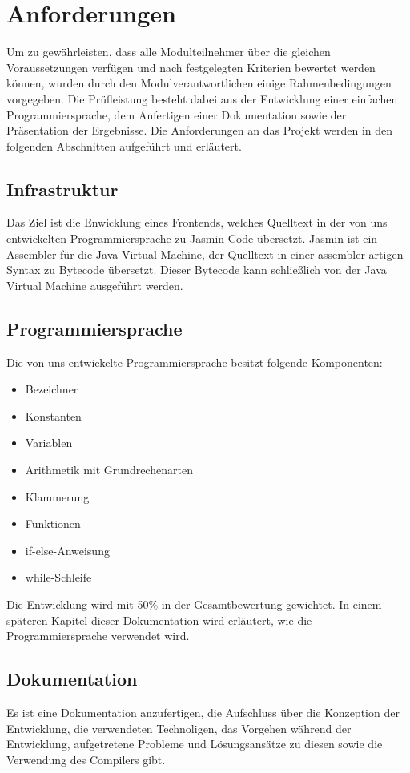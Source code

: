
\section{Anforderungen}

Um zu gewährleisten, dass alle Modulteilnehmer über die gleichen Voraussetzungen verfügen und nach festgelegten Kriterien bewertet werden können, wurden durch den Modulverantwortlichen einige Rahmenbedingungen vorgegeben. Die Prüfleistung besteht dabei aus der Entwicklung einer einfachen Programmiersprache, dem Anfertigen einer Dokumentation sowie der Präsentation der Ergebnisse. Die Anforderungen an das Projekt werden in den folgenden Abschnitten aufgeführt und erläutert.

\subsection{Infrastruktur}
Das Ziel ist die Enwicklung eines Frontends, welches Quelltext in der von uns entwickelten Programmiersprache zu Jasmin-Code übersetzt. 
Jasmin ist ein Assembler für die Java Virtual Machine, der Quelltext in einer assembler-artigen Syntax zu Bytecode übersetzt. 
Dieser Bytecode kann schließlich von der Java Virtual Machine ausgeführt werden.


\subsection{Programmiersprache}
Die von uns entwickelte Programmiersprache besitzt folgende Komponenten: 
\begin{itemize}
\item Bezeichner
\item Konstanten
\item Variablen
\item Arithmetik mit Grundrechenarten
\item Klammerung
\item Funktionen
\item if-else-Anweisung
\item while-Schleife
\end{itemize}
\noindent
Die Entwicklung wird mit 50\% in der Gesamtbewertung gewichtet.
In einem späteren Kapitel dieser Dokumentation wird erläutert, wie die Programmiersprache verwendet wird.

\subsection{Dokumentation}
Es ist eine Dokumentation anzufertigen, die Aufschluss über die Konzeption der Entwicklung, die verwendeten Technoligen, das Vorgehen während der Entwicklung, aufgetretene Probleme und Lösungsansätze zu diesen sowie die Verwendung des Compilers gibt.

